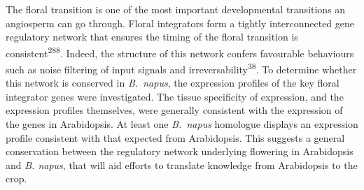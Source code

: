 \documentclass[12pt,]{book}
\begin{document}
The floral transition is one of the most important developmental
transitions an angiosperm can go through. Floral integrators form a
tightly interconnected gene regulatory network that ensures the timing
of the floral transition is consistent\textsuperscript{288}. Indeed, the
structure of this network confers favourable behaviours such as noise
filtering of input signals and irreversability\textsuperscript{38}. To
determine whether this network is conserved in \emph{B.~napus}, the
expression profiles of the key floral integrator genes were
investigated. The tissue specificity of expression, and the expression
profiles themselves, were generally consistent with the expression of
the genes in Arabidopsis. At least one \emph{B.~napus} homologue
displays an expression profile consistent with that expected from
Arabidopsis. This suggests a general conservation between the regulatory
network underlying flowering in Arabidopsis and \emph{B. napus}, that
will aid efforts to translate knowledge from Arabidopsis to the crop.
\end{document}
